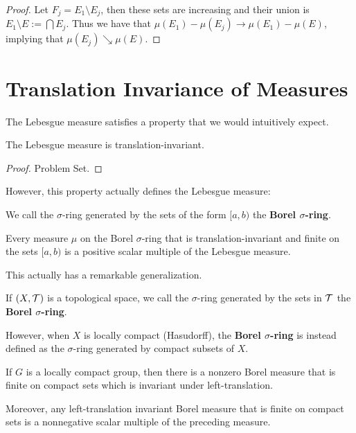 \begin{proof}
    Let $F_j = E_1 \setminus E_j$, then these sets are increasing and their union is $E_1 \setminus E := \bigcap E_j$. Thus we have that $\mu(E_1) - \mu(E_j) \to \mu(E_1) - \mu(E)$, implying that $\mu(E_j) \searrow \mu(E)$.
\end{proof}

\section{Translation Invariance of Measures}

The Lebesgue measure satisfies a property that we would intuitively expect.

\begin{proposition}
    The Lebesgue measure is translation-invariant.
\end{proposition}

\begin{proof}
    Problem Set.
\end{proof}

However, this property actually defines the Lebesgue measure:

\begin{definition}
    We call the $\sigma$-ring generated by the sets of the form $[a, b)$ the \textbf{Borel $\sigma$-ring}.
\end{definition}

\begin{proposition}
    Every measure $\mu$ on the Borel $\sigma$-ring that is translation-invariant and finite on the sets $[a, b)$ is a positive scalar multiple of the Lebesgue measure.
\end{proposition}

This actually has a remarkable generalization.

\begin{definition}
    If $(X, \mathcal T)$ is a topological space, we call the $\sigma$-ring generated by the sets in $\mathcal T$ the \textbf{Borel $\sigma$-ring}.

    However, when $X$ is locally compact (Hasudorff), the \textbf{Borel $\sigma$-ring} is instead defined as the $\sigma$-ring generated by compact subsets of $X$.
\end{definition}

\begin{theorem}[Haar]
    If $G$ is a locally compact group, then there is a nonzero Borel measure that is finite on compact sets which is invariant under left-translation.

    Moreover, any left-translation invariant Borel measure that is finite on compact sets is a nonnegative scalar multiple of the preceding measure.
\end{theorem}

